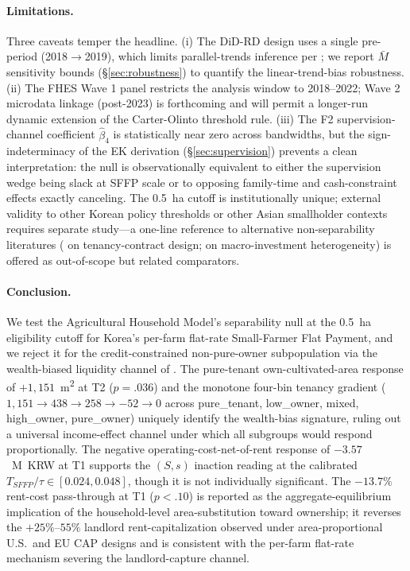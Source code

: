 \documentclass[12pt, a4paper]{article}
\begin{document}
\paragraph{Limitations.} Three caveats temper the headline. (i) The DiD-RD design uses a single pre-period (2018$\to$2019), which limits parallel-trends inference per \citet{Roth2022_pretrends}; we report \citet{RambachanRoth2023_honestdid} $\bar M$ sensitivity bounds (\S\ref{sec:robustness}) to quantify the linear-trend-bias robustness. (ii) The FHES Wave 1 panel restricts the analysis window to 2018--2022; Wave 2 microdata linkage (post-2023) is forthcoming and will permit a longer-run dynamic extension of the Carter-Olinto threshold rule. (iii) The F2 supervision-channel coefficient $\hat\beta_4$ is statistically near zero across bandwidths, but the sign-indeterminacy of the EK derivation (\S\ref{sec:supervision}) prevents a clean interpretation: the null is observationally equivalent to either the supervision wedge being slack at SFFP scale or to opposing family-time and cash-constraint effects exactly canceling. The 0.5~ha cutoff is institutionally unique; external validity to other Korean policy thresholds or other Asian smallholder contexts requires separate study---a one-line reference to alternative non-separability literatures (\citealp{BanerjeeGertlerGhatak2002_tenancy} on tenancy-contract design; \citealp{KhanThomas2008_idiosyncratic} on macro-investment heterogeneity) is offered as out-of-scope but related comparators.

\paragraph{Conclusion.}\label{sec:conclusion}
We test the Agricultural Household Model's separability null at the 0.5~ha eligibility cutoff for Korea's per-farm flat-rate Small-Farmer Flat Payment, and we reject it for the credit-constrained non-pure-owner subpopulation via the wealth-biased liquidity channel of \citet{CarterOlinto2003_liquidity}. The pure-tenant own-cultivated-area response of $+1{,}151$~m\textsuperscript{2} at T2 ($p = .036$) and the monotone four-bin tenancy gradient ($1{,}151 \to 438 \to 258 \to -52 \to 0$ across pure\_tenant, low\_owner, mixed, high\_owner, pure\_owner) uniquely identify the wealth-bias signature, ruling out a universal income-effect channel under which all subgroups would respond proportionally. The negative operating-cost-net-of-rent response of $-3.57$~M~KRW at T1 supports the $(S,s)$ inaction reading at the calibrated $T_{SFFP}/\tau \in [0.024, 0.048]$, though it is not individually significant. The $-13.7\%$ rent-cost pass-through at T1 ($p < .10$) is reported as the aggregate-equilibrium implication of the household-level area-substitution toward ownership; it reverses the $+25\%$--$55\%$ landlord rent-capitalization observed under area-proportional U.S.\ and EU CAP designs and is consistent with the per-farm flat-rate mechanism severing the landlord-capture channel.
\end{document}
